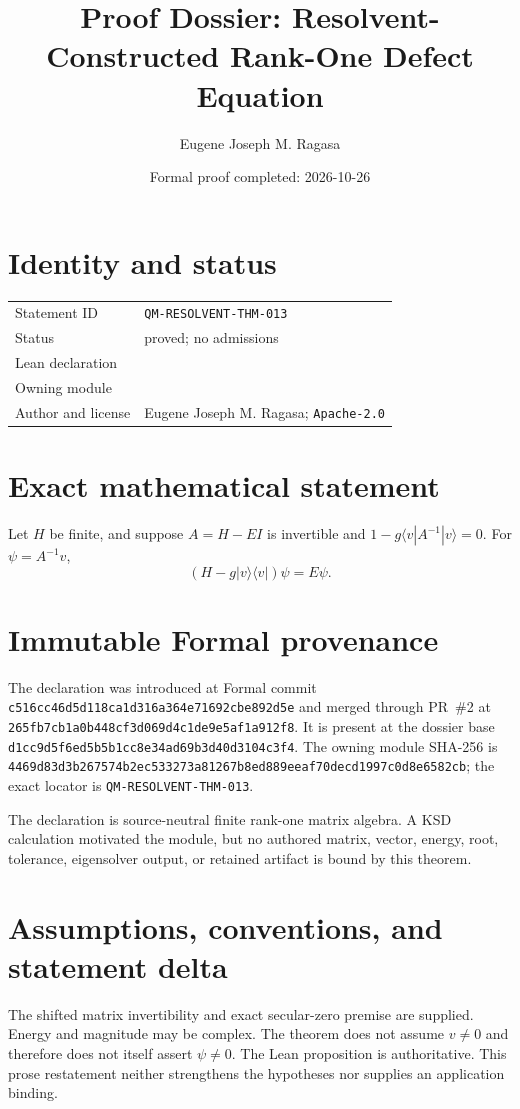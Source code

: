 \documentclass[11pt]{article}
\title{Proof Dossier: Resolvent-Constructed Rank-One Defect Equation}
\author{Eugene Joseph M. Ragasa}
\date{Formal proof completed: 2026-10-26}
\begin{document}
\raggedright
\maketitle

\section{Identity and status}
\begin{tabularx}{\textwidth}{@{}lY@{}}
\toprule
Statement ID & \texttt{QM-RESOLVENT-THM-013} \\
Status & proved; no admissions \\
Lean declaration &  \\
Owning module &  \\
Author and license & Eugene Joseph M. Ragasa; \texttt{Apache-2.0} \\
\bottomrule
\end{tabularx}

\section{Exact mathematical statement}
Let $H$ be finite, and suppose $A=H-EI$ is invertible and
$1-g\langle v|A^{-1}|v\rangle=0$.  For $\psi=A^{-1}v$,
\[
 (H-g|v\rangle\langle v|)\psi=E\psi.
\]

\section{Immutable Formal provenance}
The declaration was introduced at Formal commit
\texttt{c516cc46d5d118ca1d316a364e71692cbe892d5e} and merged through PR~\#2 at
\texttt{265fb7cb1a0b448cf3d069d4c1de9e5af1a912f8}.  It is present at the dossier base
\texttt{d1cc9d5f6ed5b5b1cc8e34ad69b3d40d3104c3f4}.  The owning module SHA-256 is
\texttt{4469d83d3b267574b2ec533273a81267b8ed889eeaf70decd1997c0d8e6582cb}; the exact locator is \texttt{QM-RESOLVENT-THM-013}.

The declaration is source-neutral finite rank-one matrix algebra.  A KSD calculation motivated the module, but no authored matrix, vector, energy, root, tolerance, eigensolver output, or retained artifact is bound by this theorem.

\section{Assumptions, conventions, and statement delta}
The shifted matrix invertibility and exact secular-zero premise are supplied.  Energy and magnitude may be complex.  The theorem does not assume $v\ne0$ and therefore does not itself assert $\psi\ne0$.
The Lean proposition is authoritative.  This prose restatement neither strengthens the hypotheses
nor supplies an application binding.
\end{document}
